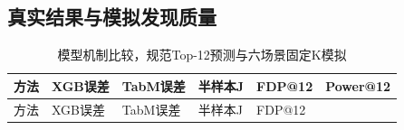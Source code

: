 \documentclass[UTF8,11pt,a4paper]{ctexart}
\begin{document}
\subsection{真实结果与模拟发现质量}

{
\footnotesize
\begin{longtable}[]{@{}
  >{\raggedright\arraybackslash}p{}
  >{\raggedright\arraybackslash}p{}
  >{\raggedright\arraybackslash}p{}
  >{\raggedright\arraybackslash}p{}
  >{\raggedright\arraybackslash}p{}
  >{\raggedright\arraybackslash}p{}@{}}
\caption{模型机制比较，规范Top-12预测与六场景固定K模拟}\tabularnewline
\toprule\noalign{}
\begin{minipage}[b]{\linewidth}\raggedright
方法
\end{minipage} & \begin{minipage}[b]{\linewidth}\raggedright
XGB误差
\end{minipage} & \begin{minipage}[b]{\linewidth}\raggedright
TabM误差
\end{minipage} & \begin{minipage}[b]{\linewidth}\raggedright
半样本J
\end{minipage} & \begin{minipage}[b]{\linewidth}\raggedright
FDP@12
\end{minipage} & \begin{minipage}[b]{\linewidth}\raggedright
Power@12
\end{minipage} \\
\midrule\noalign{}
\endfirsthead
\toprule\noalign{}
\begin{minipage}[b]{\linewidth}\raggedright
方法
\end{minipage} & \begin{minipage}[b]{\linewidth}\raggedright
XGB误差
\end{minipage} & \begin{minipage}[b]{\linewidth}\raggedright
TabM误差
\end{minipage} & \begin{minipage}[b]{\linewidth}\raggedright
半样本J
\end{minipage} & \begin{minipage}[b]{\linewidth}\raggedright
FDP@12
\end{minipage} & \begin{minipage}[b]{\linewidth}\raggedright

\end{minipage}
\end{longtable}}
\end{document}
